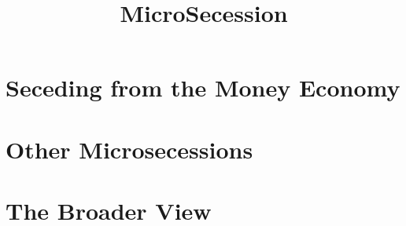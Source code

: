\documentclass{book}
\title{MicroSecession}
\begin{document}
\frontmatter


\tableofcontents

\mainmatter



\part{Seceding from the Money Economy}





\part{Other Microsecessions}






\part{The Broader View}



\end{document}
